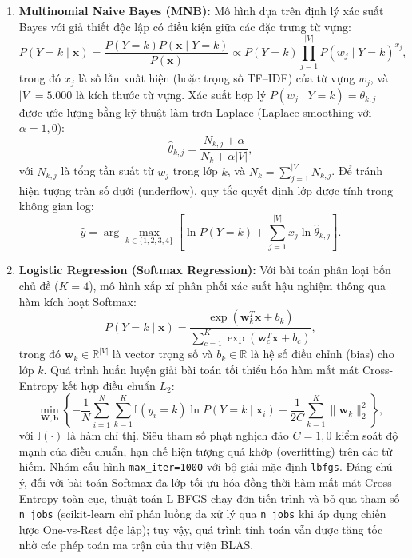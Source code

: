 \documentclass[12pt]{hcmut-report}
\begin{document}
\begin{enumerate}[leftmargin=2em,itemsep=6pt]
  \item \textbf{Multinomial Naive Bayes (MNB):} Mô hình dựa trên định lý xác suất Bayes với giả thiết độc lập có điều kiện giữa các đặc trưng từ vựng:
  \begin{equation}
    P(Y=k \mid \mathbf{x}) = \frac{P(Y=k) P(\mathbf{x} \mid Y=k)}{P(\mathbf{x})} \propto P(Y=k) \prod_{j=1}^{|V|} P(w_j \mid Y=k)^{x_j},
    \label{eq:nb-posterior}
  \end{equation}
  trong đó $x_j$ là số lần xuất hiện (hoặc trọng số TF--IDF) của từ vựng $w_j$, và $|V| = 5.000$ là kích thước từ vựng. Xác suất hợp lý $P(w_j \mid Y=k) = \theta_{k,j}$ được ước lượng bằng kỹ thuật làm trơn Laplace (Laplace smoothing với $\alpha=1{,}0$):
  \begin{equation}
    \hat{\theta}_{k,j} = \frac{N_{k,j} + \alpha}{N_k + \alpha |V|},
    \label{eq:nb-laplace}
  \end{equation}
  với $N_{k,j}$ là tổng tần suất từ $w_j$ trong lớp $k$, và $N_k = \sum_{j=1}^{|V|} N_{k,j}$. Để tránh hiện tượng tràn số dưới (underflow), quy tắc quyết định lớp được tính trong không gian log:
  \begin{equation}
    \hat{y} = \arg\max_{k \in \{1,2,3,4\}} \left[ \ln P(Y=k) + \sum_{j=1}^{|V|} x_j \ln \hat{\theta}_{k,j} \right].
    \label{eq:nb-decision}
  \end{equation}

  \item \textbf{Logistic Regression (Softmax Regression):} Với bài toán phân loại bốn chủ đề ($K=4$), mô hình xấp xỉ phân phối xác suất hậu nghiệm thông qua hàm kích hoạt Softmax:
  \begin{equation}
    P(Y=k \mid \mathbf{x}) = \frac{\exp(\mathbf{w}_k^T \mathbf{x} + b_k)}{\sum_{c=1}^K \exp(\mathbf{w}_c^T \mathbf{x} + b_c)},
    \label{eq:softmax}
  \end{equation}
  trong đó $\mathbf{w}_k \in \mathbb{R}^{|V|}$ là vector trọng số và $b_k \in \mathbb{R}$ là hệ số điều chỉnh (bias) cho lớp $k$. Quá trình huấn luyện giải bài toán tối thiểu hóa hàm mất mát Cross-Entropy kết hợp điều chuẩn $L_2$:
  \begin{equation}
    \min_{\mathbf{W}, \mathbf{b}} \left\{ -\frac{1}{N} \sum_{i=1}^N \sum_{k=1}^K \mathbb{I}(y_i = k) \ln P(Y=k \mid \mathbf{x}_i) + \frac{1}{2C} \sum_{k=1}^K \|\mathbf{w}_k\|_2^2 \right\},
    \label{eq:logreg-loss}
  \end{equation}
  với $\mathbb{I}(\cdot)$ là hàm chỉ thị. Siêu tham số phạt nghịch đảo $C=1{,}0$ kiểm soát độ mạnh của điều chuẩn, hạn chế hiện tượng quá khớp (overfitting) trên các từ hiếm. Nhóm cấu hình \texttt{max\_iter=1000} với bộ giải mặc định \texttt{lbfgs}. Đáng chú ý, đối với bài toán Softmax đa lớp tối ưu hóa đồng thời hàm mất mát Cross-Entropy toàn cục, thuật toán L-BFGS chạy đơn tiến trình và bỏ qua tham số \texttt{n\_jobs} (scikit-learn chỉ phân luồng đa xử lý qua \texttt{n\_jobs} khi áp dụng chiến lược One-vs-Rest độc lập); tuy vậy, quá trình tính toán vẫn được tăng tốc nhờ các phép toán ma trận của thư viện BLAS.


\end{enumerate}
\end{document}

